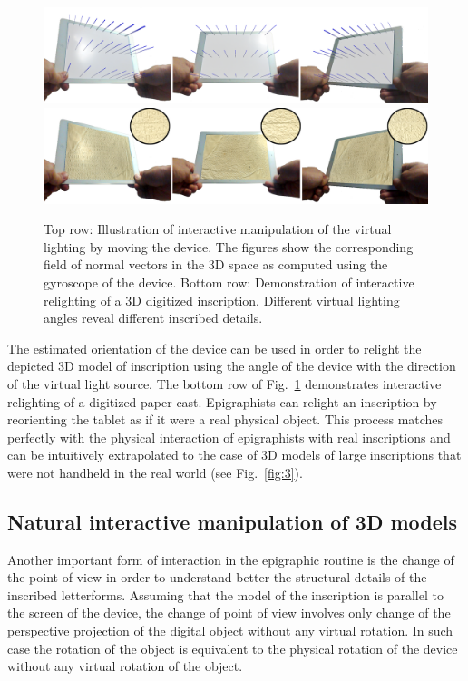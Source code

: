 \documentclass[amsthm,ebook]{saparticle}
\begin{document}
\begin{figure}[!bp]
\centering
 \includegraphics[width=\columnwidth]{EAGLE2016cameraready-img001.png}
 \includegraphics[width=\columnwidth]{EAGLE2016cameraready-img002.png}
\caption{ Top row: Illustration of interactive manipulation of the virtual lighting by moving the device. The figures
show the corresponding field of normal vectors in the 3D space as computed using the gyroscope of the device. Bottom
row: Demonstration of interactive relighting of a 3D digitized inscription. Different virtual lighting angles reveal
different inscribed details. }
\label{fig:1}
\end{figure}

 

The estimated orientation of the device can be used in order to relight the depicted 3D model of inscription using the
angle of the device with the direction of the virtual light source. The bottom row of Fig.~\ref{fig:1} demonstrates interactive
relighting of a digitized paper cast. Epigraphists can relight an inscription by reorienting the tablet as if it were a
real physical object. This process matches perfectly with the physical interaction of epigraphists with real
inscriptions and can be intuitively extrapolated to the case of 3D models of large inscriptions that were not handheld
in the real world (see Fig.~\ref{fig:3}).




\subsection{Natural interactive manipulation of 3D models }


Another important form of interaction in the epigraphic routine is the change of the point of view in order to
understand better the structural details of the inscribed letterforms. Assuming that the model of the inscription is
parallel to the screen of the device, the change of point of view involves only change of the perspective projection of
the digital object without any virtual rotation. In such case the rotation of the object is equivalent to the physical
rotation of the device without any virtual rotation of the object.
\end{document}
